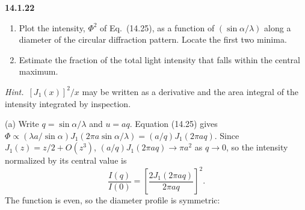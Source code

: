 \par\bigskip
\noindent\textbf{14.1.22}
\begin{enumerate}
\item[(a)] Plot the intensity, $\Phi^{2}$ of Eq.~(14.25), as a function
of $(\sin\alpha/\lambda)$ along a diameter of the circular diffraction
pattern. Locate the first two minima.
\item[(b)] Estimate the fraction of the total light intensity that
falls within the central maximum.
\end{enumerate}
\par\emph{Hint.}~$[J_{1}(x)]^{2}/x$ may be written as a derivative and
the area integral of the intensity integrated by inspection.
\par{}
\solution
(a) Write $q=\sin\alpha/\lambda$ and $u=aq$. Equation (14.25) gives
$\Phi\propto(\lambda a/\sin\alpha)J_1(2\pi a\sin\alpha/\lambda)
=(a/q)J_1(2\pi aq)$. Since $J_1(z)=z/2+O(z^3)$,
$(a/q)J_1(2\pi aq)\to\pi a^2$ as $q\to0$, so the intensity normalized
by its central value is
\[
\boxed{\frac{I(q)}{I(0)}=
\left[\frac{2J_1(2\pi aq)}{2\pi aq}\right]^2}.
\]
The function is even, so the diameter profile is symmetric:
